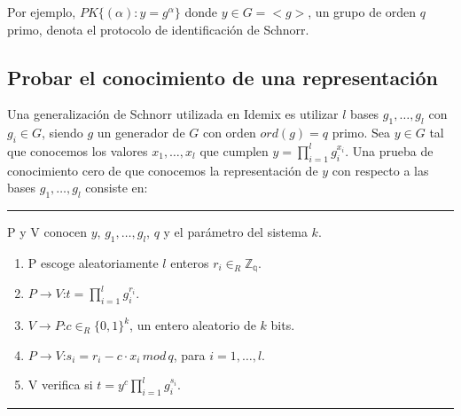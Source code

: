 Por ejemplo, $PK\{ (\alpha) : y=g^\alpha \}$ donde $y\in G = <g>$, un grupo de orden $q$ primo, denota el protocolo de identificación de Schnorr.


%


\subsection{Probar el conocimiento de una representación}\label{reprKP}

Una generalización de Schnorr utilizada en Idemix es utilizar $l$ bases $g_1, \dots, g_l$ con $g_i \in G$, siendo $g$ un generador de $G$ con orden $ord(g)=q$ primo. Sea $y\in G$ tal que conocemos los valores $x_1,\dots,x_l$ que cumplen $y = \prod_{i=1}^{l} g_i^{x_i}$. Una prueba de conocimiento cero de que conocemos la representación de $y$ con respecto a las bases $g_1, \dots, g_l$ consiste en:


\rule{\textwidth}{1pt}
\begin{algorithm}
	\hfil
	
	P y V conocen $y$, $g_1, \dots, g_l$, $q$ y el parámetro del sistema $k$.
	
	\begin{enumerate}
		\item P escoge aleatoriamente $l$ enteros $r_i \in_R \mathbb{Z_q}$.
		\item $P \rightarrow V$:\quad $t=\prod_{i=1}^{l}g_i^{r_i}$.
		\item $V \rightarrow P$:\quad $c \in_R \{0,1\}^k$, un entero aleatorio de $k$ bits.
		\item $P \rightarrow V$:\quad $s_i = r_i - c\cdot x_i \, mod \, q$, para $i=1,\dots,l$.
		\item V verifica si \quad $t = y^c \prod_{i=1}^{l} g_i^{s_i}$.
	\end{enumerate}
	
\end{algorithm}
\rule{\textwidth}{1pt}

